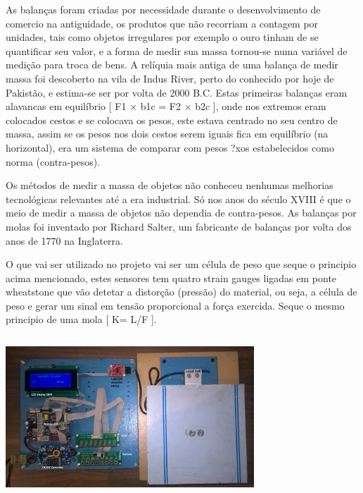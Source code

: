 
\block{~}
{
	As balanças foram criadas por necessidade durante o desenvolvimento de comercio na antiguidade, os produtos que não recorriam a contagem por unidades, tais como objetos irregulares por exemplo o ouro tinham de se quantificar seu valor, e a forma de medir sua massa tornou-se numa variável de medição para troca de bens. A relíquia mais antiga de uma balança de medir massa foi descoberto na vila de Indus River, perto do conhecido por hoje de Pakistão, e estima-se ser por volta de 2000 B.C.
	Estas primeiras balanças eram alavancas em equilíbrio [ F1 × b1c = F2 × b2c ], onde nos extremos eram colocados cestos e se colocava os pesos, este estava centrado no seu centro de massa, assim se os pesos nos dois cestos serem iguais fica em equilíbrio (na horizontal), era um sistema de comparar com pesos ?xos estabelecidos como norma (contra-pesos).
	
	Os métodos de medir a massa de objetos não conheceu nenhumas melhorias tecnológicas relevantes até a era industrial. Só nos anos do século XVIII é que o meio de medir a massa de objetos não dependia de contra-pesos. As balanças por molas foi inventado por Richard Salter, um fabricante de balanças por volta dos anos de 1770 na Inglaterra.
	
	O que vai ser utilizado no projeto vai ser um célula de peso que seque o principio acima mencionado, estes sensores tem quatro strain gauges ligadas em ponte wheatstone que vão detetar a distorção (pressão) do material, ou seja, a célula de peso e gerar um sinal em tensão proporcional a força exercida. Seque o mesmo principio de uma mola [ K= L/F ].
}

\begin{columns}
	
\end{columns}

\begin{columns}
	{
		\begin{tikzfigure}
			\includegraphics[width=0.7\textwidth]{image/PESTA/kit/Kit_Desenvolvimento_2.jpg}
		\end{tikzfigure}
	}
\end{columns}
